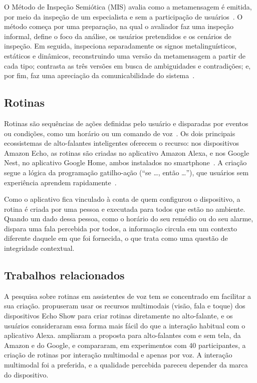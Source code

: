 O Método de Inspeção Semiótica (MIS) avalia como a metamensagem é
emitida, por meio da inspeção de um especialista e sem a participação de
usuários~\cite{desouza2009methods}. O método começa por uma preparação,
na qual o avaliador faz uma inspeção informal, define o foco da análise,
os usuários pretendidos e os cenários de inspeção. Em seguida, inspeciona
separadamente os signos metalinguísticos, estáticos e dinâmicos,
reconstruindo uma versão da metamensagem a partir de cada tipo; contrasta
as três versões em busca de ambiguidades e contradições; e, por fim, faz
uma apreciação da comunicabilidade do
sistema~\cite{desouza2006sim,fortunato2025ihc}.

\subsection{Rotinas}
\label{sec:rotinas}

Rotinas são sequências de ações definidas pelo usuário e disparadas por
eventos ou condições, como um horário ou um comando de
voz~\cite{barricelli2022multimodal}. Os dois principais ecossistemas de
alto-falantes inteligentes oferecem o recurso: nos dispositivos Amazon
Echo, as rotinas são criadas no aplicativo Amazon Alexa, e nos Google
Nest, no aplicativo Google Home, ambos instalados no
smartphone~\cite{barricelli2024routines}. A criação segue a lógica da
programação gatilho-ação (``se \ldots{}, então \ldots{}''), que usuários
sem experiência aprendem rapidamente~\cite{ur2014tap}.

Como o aplicativo fica vinculado à conta de quem configurou o
dispositivo, a rotina é criada por uma pessoa e executada para todos que
estão no ambiente. Quando um dado dessa pessoa, como o horário do seu
remédio ou do seu alarme, dispara uma fala percebida por todos, a
informação circula em um contexto diferente daquele em que foi
fornecida, o que \citet{nissenbaum2004privacy} trata como uma questão de
integridade contextual.

\subsection{Trabalhos relacionados}
\label{sec:relacionados}

A pesquisa sobre rotinas em assistentes de voz tem se concentrado em
facilitar a sua criação. \citet{barricelli2022multimodal} propuseram usar
os recursos multimodais (visão, fala e toque) dos dispositivos Echo Show
para criar rotinas diretamente no alto-falante, e os usuários
consideraram essa forma mais fácil do que a interação habitual com o
aplicativo Alexa. \citet{barricelli2024routines} ampliaram a proposta
para alto-falantes com e sem tela, da Amazon e do Google, e compararam, em
experimentos com 40 participantes, a criação de rotinas por interação
multimodal e apenas por voz. A interação multimodal foi a preferida, e a
qualidade percebida pareceu depender da marca do dispositivo.


